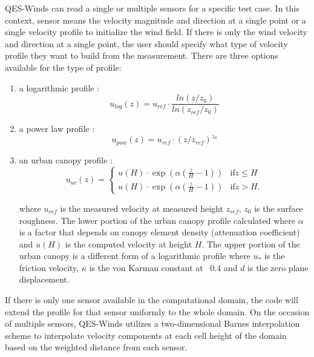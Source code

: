 QES-Winds can read a single or multiple sensors for a specific test case. In this context, sensor means the velocity magnitude and direction at a single point or a single velocity profile to initialize the wind field. If there is only the wind velocity and direction at a single point, the user should specify what type of velocity profile they want to build from the measurement. There are three options available for the type of profile:

\begin{enumerate}
\item a logarithmic profile \cite{favaloro2008toward}:
\begin{equation}
\label{eq:log_law}
u_{log}(z) = u_{ref}\cdot\frac{ln(z/z_0)}{ln(z_{ref}/z_0)}
\end{equation}

\item a power law profile \cite{favaloro2008toward}:
\begin{equation}
\label{eq:power_law}
u_{pow}(z) = u_{ref}\cdot(z/z_{ref})^{z_0}
\end{equation}

\item an urban canopy profile \cite{favaloro2008toward}\cite{pardyjak2008near}:
\begin{equation}
\label{eq:urban_canopy_low}
u_{uc}(z)=\begin{cases}
u(H)\cdot\exp(\alpha(\frac{z}{H}-1)) & \text{if} z\leq H\\
u(H)\cdot\exp(\alpha(\frac{z}{H}-1))& \text{if} z > H.
\end{cases}
\end{equation}

where $u_{ref}$ is the measured velocity at measured height $z_{ref}$, $z_0$ is the surface
roughness. The lower portion of the urban canopy profile calculated where $\alpha$ is a factor that depends on canopy
element density (attenuation coefficient) and $u(H)$ is the computed velocity at height $H$. The upper portion of the urban canopy is a different form of a logarithmic profile where $u_*$ is the friction velocity,
$\kappa$ is the von Karman constant at ~0.4 and $d$ is the zero plane displacement.

\end{enumerate}

If there is only one sensor available in the computational domain, the code will extend the profile for that sensor uniformly to the whole domain. On the occasion of multiple sensors, QES-Winds utilizes a two-dimensional Barnes interpolation scheme \cite{koch1983interactive,booth2012validation} to interpolate velocity components at each cell height of the domain based on the weighted distance from each sensor.

